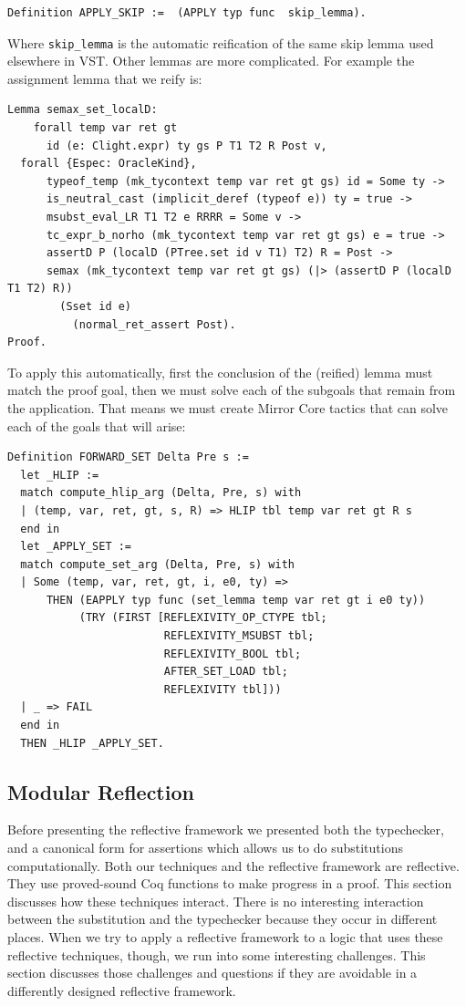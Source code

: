 \documentclass{puthesis}
\begin{document}
\begin{lstlisting}
Definition APPLY_SKIP :=  (APPLY typ func  skip_lemma).
\end{lstlisting}

Where \lstinline|skip_lemma| is the automatic reification of the same
skip lemma used elsewhere in VST. Other lemmas are more
complicated. For example the assignment lemma that we reify is:

\begin{lstlisting}
Lemma semax_set_localD:
    forall temp var ret gt 
      id (e: Clight.expr) ty gs P T1 T2 R Post v,
  forall {Espec: OracleKind},
      typeof_temp (mk_tycontext temp var ret gt gs) id = Some ty -> 
      is_neutral_cast (implicit_deref (typeof e)) ty = true ->
      msubst_eval_LR T1 T2 e RRRR = Some v ->
      tc_expr_b_norho (mk_tycontext temp var ret gt gs) e = true ->
      assertD P (localD (PTree.set id v T1) T2) R = Post ->
      semax (mk_tycontext temp var ret gt gs) (|> (assertD P (localD T1 T2) R))
        (Sset id e)
          (normal_ret_assert Post).
Proof.
\end{lstlisting}

To apply this automatically, first the conclusion of the (reified)
lemma must match the proof goal, then we must solve each of the
subgoals that remain from the application. That means we must create
Mirror Core tactics that can solve each of the goals that will arise:

\begin{lstlisting}
Definition FORWARD_SET Delta Pre s :=
  let _HLIP :=
  match compute_hlip_arg (Delta, Pre, s) with
  | (temp, var, ret, gt, s, R) => HLIP tbl temp var ret gt R s
  end in
  let _APPLY_SET :=
  match compute_set_arg (Delta, Pre, s) with
  | Some (temp, var, ret, gt, i, e0, ty) =>
      THEN (EAPPLY typ func (set_lemma temp var ret gt i e0 ty))
           (TRY (FIRST [REFLEXIVITY_OP_CTYPE tbl;
                        REFLEXIVITY_MSUBST tbl; 
                        REFLEXIVITY_BOOL tbl;
                        AFTER_SET_LOAD tbl;
                        REFLEXIVITY tbl]))
  | _ => FAIL
  end in
  THEN _HLIP _APPLY_SET.
\end{lstlisting}


\subsection{Modular Reflection}

Before presenting the reflective framework we presented both the
typechecker, and a canonical form for assertions which allows us to do
substitutions computationally.  Both our techniques and the reflective
framework are reflective.  They use proved-sound Coq functions to make
progress in a proof. This section discusses how these techniques
interact. There is no interesting interaction between the substitution
and the typechecker because they occur in different places. When we
try to apply a reflective framework to a logic that uses these
reflective techniques, though, we run into some interesting
challenges. This section discusses those challenges and questions if
they are avoidable in a differently designed reflective framework.
\end{document}
